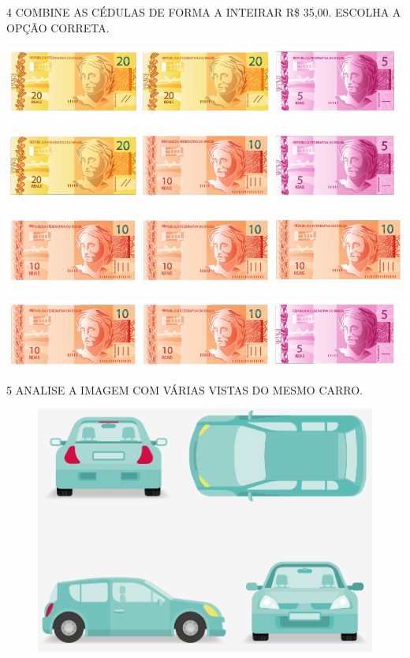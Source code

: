 \pagebreak
\num{4} COMBINE AS CÉDULAS DE FORMA A INTEIRAR R\$ 35,00. ESCOLHA A OPÇÃO CORRETA.

\begin{multicols}{2}
\begin{escolha}
\item \includegraphics[width=.3\textwidth]{./media/SAEB_1ANO_MAT_FIGURA129a.png}
\item \includegraphics[width=.3\textwidth]{./media/SAEB_1ANO_MAT_FIGURA129b.png}

\columnbreak

\item \includegraphics[width=.3\textwidth]{./media/SAEB_1ANO_MAT_FIGURA129c.png}
\item \includegraphics[width=.3\textwidth]{./media/SAEB_1ANO_MAT_FIGURA129d.png}
\end{escolha}
\end{multicols}

\num{5} ANALISE A IMAGEM COM VÁRIAS VISTAS DO MESMO CARRO.


\begin{figure}[htpb!]
\centering
\includegraphics[width=.5\textwidth]{./media/SAEB_1ANO_MAT_FIGURA130.png}
\end{figure}

